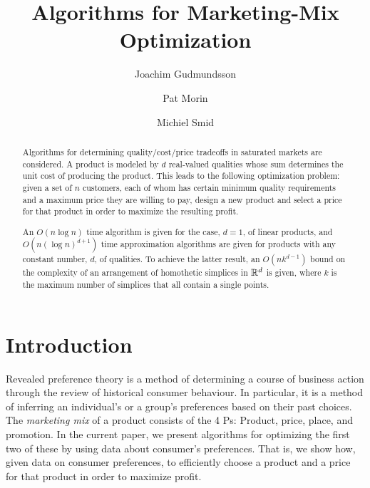 \documentclass{llncs}
\title{Algorithms for Marketing-Mix Optimization}
\author{Joachim Gudmundsson%
	\and Pat Morin%
	\and Michiel Smid}
\institute{NICTA and Carleton University}
\begin{document}
\maketitle
\begin{abstract}
  Algorithms for determining quality/cost/price tradeoffs in saturated
  markets are considered.  A product is modeled by $d$ real-valued
  qualities whose sum determines the unit cost of producing the product.
  This leads to the following optimization problem: given a set of $n$
  customers, each of whom has certain minimum quality requirements and a
  maximum price they are willing to pay, design a new product and select
  a price for that product in order to maximize the resulting profit.

  An $O(n\log n)$ time algorithm is given for the case, $d=1$, of linear
  products, and $O(n(\log n)^{d+1})$ time approximation algorithms
  are given for products with any constant number, $d$, of qualities.
  To achieve the latter result, an $O(nk^{d-1})$ bound on the complexity
  of an arrangement of homothetic simplices in $\mathbb{R}^d$ is given, where $k$
  is the maximum number of simplices that all contain a single points.
\end{abstract}

\section{Introduction}

Revealed preference theory \cite{v06} is a method of determining a course
of business action through the review of historical consumer behaviour.  In
particular, it is a method of inferring an individual's or a group's
preferences based on their past choices.  The \emph{marketing mix}
\cite{kpkl05} of a product consists of the 4 Ps: Product, price, place, and
promotion.  In the current paper, we present algorithms for optimizing the
first two of these by using data about consumer's preferences.  That is, we
show how, given data on consumer preferences, to efficiently choose a
product and a price for that product in order to maximize profit.
\end{document}
